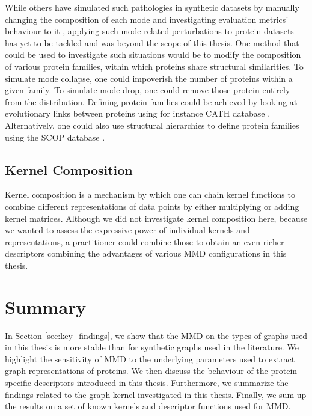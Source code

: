 While others have simulated such pathologies in synthetic datasets by manually
changing the composition of each mode and investigating evaluation metrics'
behaviour to it \citep{thompson2022evaluation}, applying such mode-related
perturbations to protein datasets has yet to be tackled and was beyond the scope
of this thesis. One method that could be used to investigate such situations
would be to modify the composition of various protein families, within which proteins
share structural similarities. To simulate mode collapse, one could impoverish the number of proteins
within a given family. To simulate mode drop, one could remove those protein entirely from
the distribution. Defining protein families could be achieved by looking at
evolutionary links between proteins using for instance CATH database
\citep{orengo1997cath}. Alternatively, one could also use structural hierarchies
to define protein families using the SCOP database \citep{murzin1995scop}.

\subsection{Kernel Composition}

Kernel composition is a mechanism by which one can chain kernel functions to
combine different representations of data points by either multiplying or adding
kernel matrices. Although we did not investigate kernel composition here,
because we wanted to assess the expressive power of individual kernels and
representations, a practitioner could combine those to obtain an even richer
descriptors combining the advantages of various MMD configurations in this
thesis.

\section{Summary}


In Section \ref{sec:key_findings}, we show that the MMD on the types of graphs used in this
thesis is more stable than for synthetic graphs used in the literature. We
highlight the sensitivity of MMD to the underlying parameters used to extract
graph representations of proteins. We then discuss the behaviour of the
protein-specific descriptors introduced in this thesis. Furthermore, we
summarize the findings related to the graph kernel investigated in this thesis.
Finally, we sum up the results on a set of known kernels and descriptor
functions used for MMD.

